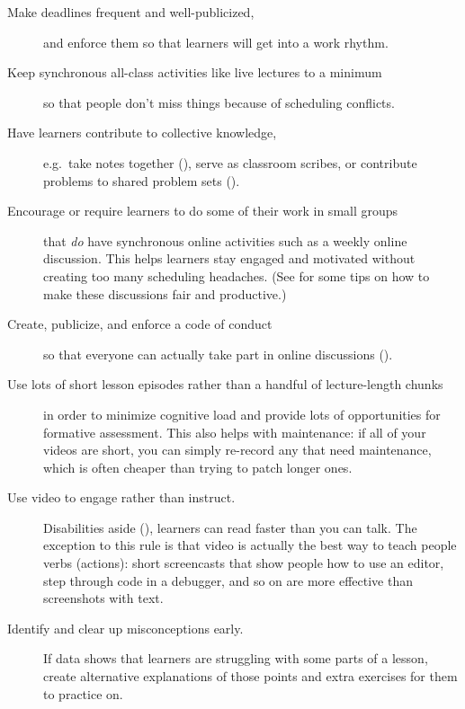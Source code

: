 \begin{description}

\item[Make deadlines frequent and well-publicized,]
  and enforce them so that learners will get into a work rhythm.

\item[Keep synchronous all-class activities like live lectures to a minimum]
  so that people don't miss things because of scheduling conflicts.

\item[Have learners contribute to collective knowledge,]
  e.g.\ take notes together (),
  serve as classroom scribes,
  or contribute problems to shared problem sets ().

\item[Encourage or require learners to do some of their work in small groups]
  that \emph{do} have synchronous online activities
  such as a weekly online discussion.
  This helps learners stay engaged and motivated without creating too many scheduling headaches.
  (See  for some tips on how to make these discussions fair and productive.)

\item[Create, publicize, and enforce a code of conduct]
  so that everyone can actually take part in online discussions ().

\item[Use lots of short lesson episodes rather than a handful of lecture-length chunks]
  in order to minimize cognitive load
  and provide lots of opportunities for formative assessment.
  This also helps with maintenance:
  if all of your videos are short,
  you can simply re-record any that need maintenance,
  which is often cheaper than trying to patch longer ones.

\item[Use video to engage rather than instruct.]
  Disabilities aside (),
  learners can read faster than you can talk.
  The exception to this rule is that
  video is actually the best way to teach people verbs (actions):
  short screencasts that show people how to use an editor,
  step through code in a debugger,
  and so on are more effective than screenshots with text.

\item[Identify and clear up misconceptions early.]
  If data shows that learners are struggling with some parts of a lesson,
  create alternative explanations of those points
  and extra exercises for them to practice on.

\end{description}

